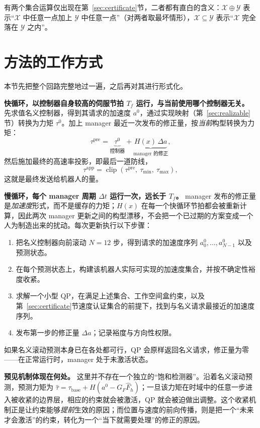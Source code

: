 \documentclass[journal]{IEEEtran}
\begin{document}
有两个集合运算仅出现在第~\ref{sec:certificate}节，二者都有直白的含义：$\mathcal X\oplus\mathcal Y$ 表示“$\mathcal X$ 中任意一点加上 $\mathcal Y$ 中任意一点”（对两者取最坏情形），$\mathcal X\subseteq\mathcal Y$ 表示“$\mathcal X$ 完全落在 $\mathcal Y$ 之内”。

\section{方法的工作方式}
\label{sec:howitworks}

本节先把整个回路完整地过一遍，之后再对其进行形式化。

\textbf{快循环，以控制器自身较高的伺服节拍 $T_f$ 运行，与当前使用哪个控制器无关。} 先求值名义控制器，得到其请求的加速度 $a^0$，通过实现映射（第~\ref{sec:realizable}节）转换为力矩 $\tau^0$。加上 manager 最近一次发布的修正量，按\emph{当前}构型转换为力矩：
\[
\tau^{\mathrm{pre}}=\underbrace{\tau^0}_{\text{控制器}}+\underbrace{H(x)\,\Delta a}_{\text{manager 的修正}},
\]
然后施加最终的高速率投影，即最后一道防线，
\[
\tau^{\mathrm{app}}=\operatorname{clip}\left(\tau^{\mathrm{pre}},\ \tau_{\min},\ \tau_{\max}\right),
\]
这就是最终发送给机器人的量。

\textbf{慢循环，每个 manager 周期 $\Delta t$ 运行一次，远长于 $T_f$。} manager 发布的修正量是\emph{加速度}形式，而不是缓存的力矩；$H(x)$ 在每一个快循环节拍都会被重新计算，因此两次 manager 更新之间的构型漂移，不会把一个已过期的方案变成一个人为制造出来的扰动。每次更新执行以下步骤：
\begin{enumerate}
\item 把名义控制器向前滚动 $N=12$ 步，得到请求的加速度序列 $a^0_0,\dots,a^0_{N-1}$ 以及预测状态。
\item 在每个预测状态上，构建该机器人实际可实现的加速度集合，并按不确定性裕度收紧。
\item 求解一个小型 QP，在满足上述集合、工作空间盒约束，以及第~\ref{sec:certificate}节速度认证集合的前提下，找到与名义请求最接近的加速度序列。
\item 发布第一步的修正量 $\Delta a$；记录裕度与方向性权限。
\end{enumerate}

如果名义滚动预测本身已在各处都可行，QP 会原样返回名义请求，修正量为零——在正常运行时，manager 处于未激活状态。

\textbf{预见机制体现在何处。} 这里并不存在一个独立的“饱和检测器”。沿着名义滚动预测，预测力矩为 $\hat\tau=\tau_{\mathrm{base}}+H(a^{0}-G_F\hat F_h)$；一旦该力矩在时域中的任意一步进入被收紧的边界层，相应的约束就会被激活，QP 就会被迫做出调整。这个收紧机制正是让约束能够\emph{提前}生效的原因；而位置与速度的前向传播，则是把一个“未来才会激活”的约束，转化为一个“当下就需要处理”的修正的原因。
\end{document}
